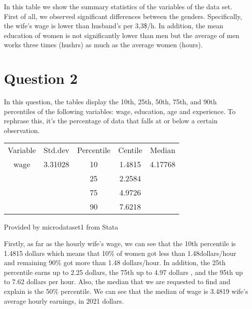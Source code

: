 \documentclass[10pt,towside,a4paper]{article}
\begin{document}
	
	
	In this table we show the summary statistics of the variables of the data set. First of all, we observed significant differences between the genders. Specifically, the wife’s wage is lower than husband’s per 3,3\$/h. In addition, the mean education of women is not significantly lower than men but the average of men works three times (hushrs) as much as the average women (hours).
	
	\vspace {0.5\baselineskip}

	
	\section*{Question 2}
	
	
	
	In this question, the tables display the 10th, 25th, 50th, 75th, and 90th percentiles of the following variables: wage, education, age and experience. To rephrase this, it’s the percentage of data that falls at or below a certain observation.
	
	\vspace {0.5\baselineskip}


\begin{table}[h]
	\begin{Center}
		 \label{tab:title} 
				\begin{tabular}{|c|c|c|c|c|}
					\toprule
					Variable & Std.dev & Percentile & Centile 	&	Median 	 \\
					wage     & 3.31028 & 10 		& 1.4815  	&	4.17768  \\
					 		 &		   & 25  	    & 2.2584    &  \\                            
							 &          & 75  		& 4.9726    &   \\
					  	   	 &          & 90  		& 7.6218    & \\
				\bottomrule
			\end{tabular} \par
		Provided by microdataset1 from Stata
	\end{Center}
	
	Firstly, as far as the hourly wife’s wage, we can see that the 10th percentile is 1.4815 dollars which means that 10\% of women got less than 1.48dollars/hour and remaining 90\% got more than 1.48 dollars/hour. In addition, the 25th percentile earns up to 2.25 dollars, the 75th up to 4.97 dollars , and the 95th up to 7.62 dollars per hour. Also, the median that we are requested to find and explain is the 50\% percentile. We can see that the median of  wage is 3.4819 wife’s average hourly earnings, in 2021 dollars.	
\end{table}	
	
\end{document}

